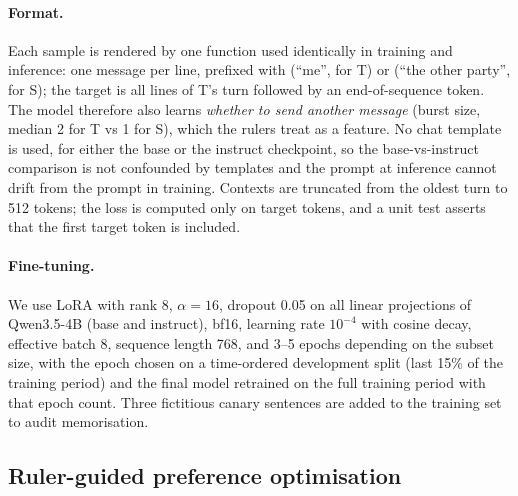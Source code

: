 \paragraph{Format.}
Each sample is rendered by one function used identically in training and inference: one message per line, prefixed with  (``me'', for T) or  (``the other party'', for S); the target is all lines of T's turn followed by an end-of-sequence token.
The model therefore also learns \emph{whether to send another message} (burst size, median 2 for T vs 1 for S), which the rulers treat as a feature.
No chat template is used, for either the base or the instruct checkpoint, so the base-vs-instruct comparison is not confounded by templates and the prompt at inference cannot drift from the prompt in training.
Contexts are truncated from the oldest turn to 512 tokens; the loss is computed only on target tokens, and a unit test asserts that the first target token is included.

\paragraph{Fine-tuning.}
We use LoRA \citep{hu2022lora} with rank 8, $\alpha = 16$, dropout 0.05 on all linear projections of Qwen3.5-4B (base and instruct), bf16, learning rate $10^{-4}$ with cosine decay, effective batch 8, sequence length 768, and 3--5 epochs depending on the subset size, with the epoch chosen on a time-ordered development split (last 15\% of the training period) and the final model retrained on the full training period with that epoch count.
Three fictitious canary sentences are added to the training set to audit memorisation.

\subsection{Ruler-guided preference optimisation}
\label{sec:pref}

